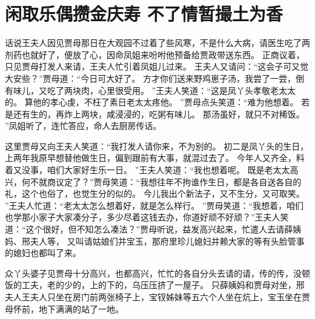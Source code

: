 \chapter{闲取乐偶攒金庆寿 \quad 不了情暂撮土为香}
\par
话说王夫人因见贾母那日在大观园不过着了些风寒，不是什么大病，请医生吃了两剂药也就好了，便放了心，因命凤姐来吩咐他预备给贾政带送东西。
正商议着，只见贾母打发人来请，王夫人忙引着凤姐儿过来。
王夫人又请问：“这会子可又觉大安些？”贾母道：“今日可大好了。
方才你们送来野鸡崽子汤，我尝了一尝，倒有味儿，又吃了两块肉，心里很受用。
”王夫人笑道：“这是凤丫头孝敬老太太的。
算他的孝心虔，不枉了素日老太太疼他。
”贾母点头笑道：“难为他想着。
若是还有生的，再炸上两块，咸浸浸的，吃粥有味儿。
那汤虽好，就只不对稀饭。
”凤姐听了，连忙答应，命人去厨房传话。
\par
这里贾母又向王夫人笑道：“我打发人请你来，不为别的。
初二是凤丫头的生日，上两年我原早想替他做生日，偏到跟前有大事，就混过去了。
今年人又齐全，料着又没事，咱们大家好生乐一日。
”王夫人笑道：“我也想着呢。
既是老太太高兴，何不就商议定了？”贾母笑道：“我想往年不拘谁作生日，都是各自送各自的礼，这个也俗了，也觉生分的似的。
今儿我出个新法子，又不生分，又可取笑。
”王夫人忙道：“老太太怎么想着好，就是怎么样行。
”贾母笑道：“我想着，咱们也学那小家子大家凑分子，多少尽着这钱去办，你道好顽不好顽？”王夫人笑道：“这个很好，但不知怎么凑法？”贾母听说，益发高兴起来，忙遣人去请薛姨妈、邢夫人等，
又叫请姑娘们并宝玉，那府里珍儿媳妇并赖大家的等有头脸管事的媳妇也都叫了来。
\par
众丫头婆子见贾母十分高兴，也都高兴，忙忙的各自分头去请的请，传的传，没顿饭的工夫，老的少的，上的下的，乌压压挤了一屋子。
只薛姨妈和贾母对坐，邢夫人王夫人只坐在房门前两张椅子上，宝钗姊妹等五六个人坐在炕上，宝玉坐在贾母怀前，地下满满的站了一地。

